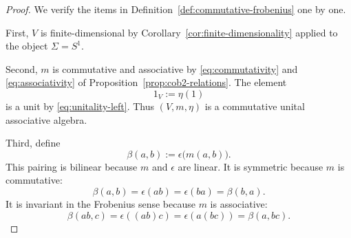 \begin{proof}
We verify the items in Definition~\ref{def:commutative-frobenius} one by one.

\medskip

\noindent First, $V$ is finite-dimensional by Corollary~\ref{cor:finite-dimensionality} applied to the object $\Sigma = S^1$.

\medskip

\noindent Second, $m$ is commutative and associative by \eqref{eq:commutativity} and \eqref{eq:associativity} of Proposition~\ref{prop:cob2-relations}. The element
\begin{equation}\label{eq:unit-element}
1_V := \eta(1)
\end{equation}
is a unit by \eqref{eq:unitality-left}. Thus $(V,m,\eta)$ is a commutative unital associative algebra.

\medskip

\noindent Third, define
\begin{equation}\label{eq:beta-main}
\beta(a,b) := \epsilon\bigl(m(a,b)\bigr).
\end{equation}
This pairing is bilinear because $m$ and $\epsilon$ are linear. It is symmetric because $m$ is commutative:
\begin{equation}\label{eq:beta-symmetric}
\beta(a,b) = \epsilon(ab) = \epsilon(ba) = \beta(b,a).
\end{equation}
It is invariant in the Frobenius sense because $m$ is associative:
\begin{equation}\label{eq:beta-associative}
\beta(ab,c) = \epsilon((ab)c) = \epsilon(a(bc)) = \beta(a,bc).
\end{equation}

\medskip


\end{proof}
